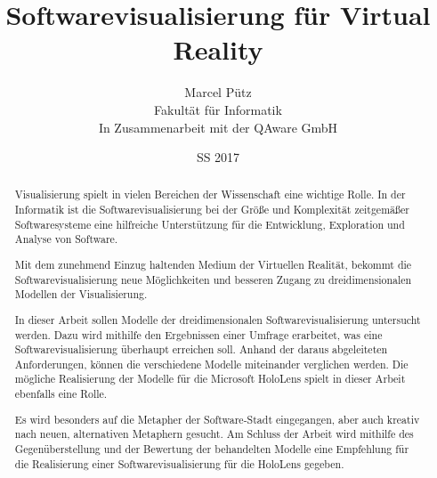 \titlehead{
\raggedleft
\texttt{[image: \\figdir/HS\_Logo\_aktuell\_CMYK.eps]}
}
%
\subject{Masterseminar}

\title{
Softwarevisualisierung für Virtual Reality
}

\author{
Marcel Pütz\\
Fakultät für Informatik\\
{\small In Zusammenarbeit mit der QAware GmbH}
}

\date{SS 2017}

\maketitle

\begin{abstract}
Visualisierung spielt in vielen Bereichen der Wissenschaft eine wichtige Rolle. In der Informatik ist die Softwarevisualisierung bei der Größe und Komplexität zeitgemäßer Softwaresysteme eine hilfreiche Unterstützung für die Entwicklung, Exploration und Analyse von Software.

Mit dem zunehmend Einzug haltenden Medium der Virtuellen Realität, bekommt die Softwarevisualisierung neue Möglichkeiten und besseren Zugang zu dreidimensionalen Modellen der Visualisierung.

In dieser Arbeit sollen Modelle der dreidimensionalen Softwarevisualisierung untersucht werden. Dazu wird mithilfe den Ergebnissen einer Umfrage erarbeitet, was eine Softwarevisualisierung überhaupt erreichen soll. Anhand der daraus abgeleiteten Anforderungen, können die verschiedene Modelle miteinander verglichen werden. Die mögliche Realisierung der Modelle für die Microsoft HoloLens spielt in dieser Arbeit ebenfalls eine Rolle.

Es wird besonders auf die Metapher der Software-Stadt eingegangen, aber auch kreativ nach neuen, alternativen Metaphern gesucht. Am Schluss der Arbeit wird mithilfe des Gegenüberstellung und der Bewertung der behandelten Modelle eine Empfehlung für die Realisierung einer Softwarevisualisierung für die HoloLens gegeben.

\end{abstract}

\clearpage

\tableofcontents

